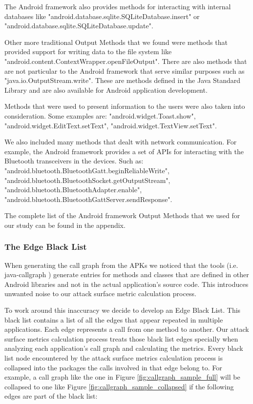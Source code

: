 \documentclass{sig-alternate}
\begin{document}
The Android framework also provides methods for interacting with internal databases like "android.\-database.\-sqlite.\-SQLiteDatabase.\-insert" or "android.\-database.\-sqlite.\-SQLite\-Database.\-update".

Other more traditional Output Methods that we found were methods that provided support for writing data to the file system like "android.\-content.\-Context\-Wrapper.\-open\-File\-Output". There are also methods that are not particular to the Android framework that serve similar purposes such as "java.\-io.\-OutputStream.\-write". These are methods defined in the Java Standard Library and are also available for Android application development. 

Methods that were used to present information to the users were also taken into consideration. Some examples are: "android.\-widget.\-Toast.\-show", "android.\-widget.\-Edit\-Text.\-set\-Text", "android.\-widget.\-TextView.\-set\-Text".

We also included many methods that dealt with network communication. For example, the Android framework provides a set of APIs for interacting with the Bluetooth trans\-ceivers in the devices. Such as: "android.\-bluetooth.\-Bluetooth\-Gatt.\-begin\-Reliable\-Write", "android.\-bluetooth.\-Bluetooth\-Socket.\-get\-Output\-Stream", "android.\-bluetooth.\-Bluetooth\-Adapter.\-enable", "android.\-bluetooth.\-Bluetooth\-Gatt\-Server.\-send\-Response".

The complete list of the Android framework Output Methods that we used for our study can be found in the appendix.

\subsubsection{The Edge Black List}

When generating the call graph from the APKs we noticed that the tools (i.e. java-callgraph \cite{java_callgraph}) generate entries for methods and classes that are defined in other Android libraries and not in the actual application's source code. This introduces unwanted noise to our attack surface metric calculation process. 

To work around this inaccuracy we decide to develop an Edge Black List. This black list contains a list of all the edges that appear repeated in multiple applications. Each edge represents a call from one method to another. Our attack surface metrics calculation process treats those black list edges specially when analyzing each application's call graph and calculating the metrics. Every black list node encountered by the attack surface metrics calculation process is collapsed into the packages the calls involved in that edge belong to. For example, a call graph like the one in Figure \ref{fig:callgraph_sample_full} will be collapsed to one like Figure \ref{fig:callgraph_sample_collapsed} if the following edges are part of the black list:
\end{document}
